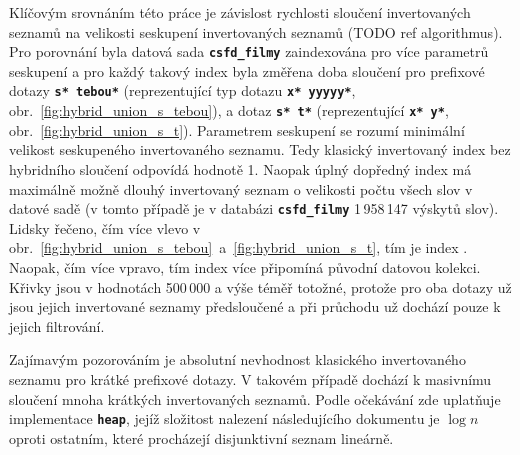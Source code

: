 \documentclass[11pt,letterpaper,oneside,openright]{book}
\newcommand{\bftt}[1]{\texttt{\textbf{#1}}}
\begin{document}
Klíčovým srovnáním této práce je závislost rychlosti sloučení invertovaných
seznamů na velikosti seskupení invertovaných seznamů (TODO ref algorithmus).
Pro porovnání byla datová sada \bftt{csfd\_filmy} zaindexována pro více
parametrů seskupení a pro každý takový index byla změřena doba sloučení pro
prefixové dotazy \bftt{s* tebou*} (reprezentující typ dotazu \bftt{x* yyyyy*},
obr.~\ref{fig:hybrid_union_s_tebou}), a dotaz \bftt{s* t*} (reprezentující
\bftt{x* y*}, obr.~\ref{fig:hybrid_union_s_t}). Parametrem seskupení se rozumí
minimální velikost seskupeného invertovaného seznamu. Tedy klasický invertovaný
index bez hybridního sloučení odpovídá hodnotě 1. Naopak úplný dopředný index
má maximálně možně dlouhý invertovaný seznam o velikosti počtu všech slov v
datové sadě (v tomto případě je v databázi \bftt{csfd\_filmy} 1\,958\,147
výskytů slov). Lidsky řečeno, čím více vlevo v
obr.~\ref{fig:hybrid_union_s_tebou}~a~\ref{fig:hybrid_union_s_t}, tím je index
. Naopak, čím více vpravo, tím index více připomíná
původní datovou kolekci. Křivky jsou v hodnotách 500\,000 a výše téměř totožné,
protože pro oba dotazy už jsou jejich invertované seznamy předsloučené a při
průchodu už dochází pouze k jejich filtrování.

Zajímavým pozorováním je absolutní nevhodnost klasického invertovaného seznamu
pro krátké prefixové dotazy. V takovém případě dochází k masivnímu sloučení
mnoha krátkých invertovaných seznamů. Podle očekávání zde uplatňuje
implementace \bftt{heap}, jejíž složitost nalezení následujícího dokumentu je
$\log n$ oproti ostatním, které procházejí disjunktivní seznam lineárně.
\end{document}
